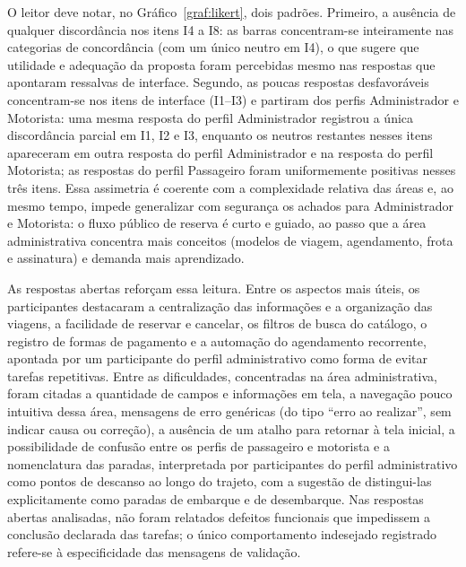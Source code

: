 \documentclass[a4paper,12pt]{article}
\begin{document}
O leitor deve notar, no Gráfico~\ref{graf:likert}, dois padrões. Primeiro, a ausência de qualquer discordância nos itens I4 a I8: as barras concentram-se inteiramente nas categorias de concordância (com um único neutro em I4), o que sugere que utilidade e adequação da proposta foram percebidas mesmo nas respostas que apontaram ressalvas de interface. Segundo, as poucas respostas desfavoráveis concentram-se nos itens de interface (I1--I3) e partiram dos perfis Administrador e Motorista: uma mesma resposta do perfil Administrador registrou a única discordância parcial em I1, I2 e I3, enquanto os neutros restantes nesses itens apareceram em outra resposta do perfil Administrador e na resposta do perfil Motorista; as respostas do perfil Passageiro foram uniformemente positivas nesses três itens. Essa assimetria é coerente com a complexidade relativa das áreas e, ao mesmo tempo, impede generalizar com segurança os achados para Administrador e Motorista: o fluxo público de reserva é curto e guiado, ao passo que a área administrativa concentra mais conceitos (modelos de viagem, agendamento, frota e assinatura) e demanda mais aprendizado.

As respostas abertas reforçam essa leitura. Entre os aspectos mais úteis, os participantes destacaram a centralização das informações e a organização das viagens, a facilidade de reservar e cancelar, os filtros de busca do catálogo, o registro de formas de pagamento e a automação do agendamento recorrente, apontada por um participante do perfil administrativo como forma de evitar tarefas repetitivas. Entre as dificuldades, concentradas na área administrativa, foram citadas a quantidade de campos e informações em tela, a navegação pouco intuitiva dessa área, mensagens de erro genéricas (do tipo ``erro ao realizar'', sem indicar causa ou correção), a ausência de um atalho para retornar à tela inicial, a possibilidade de confusão entre os perfis de passageiro e motorista e a nomenclatura das paradas, interpretada por participantes do perfil administrativo como pontos de descanso ao longo do trajeto, com a sugestão de distingui-las explicitamente como paradas de embarque e de desembarque. Nas respostas abertas analisadas, não foram relatados defeitos funcionais que impedissem a conclusão declarada das tarefas; o único comportamento indesejado registrado refere-se à especificidade das mensagens de validação.
\end{document}
